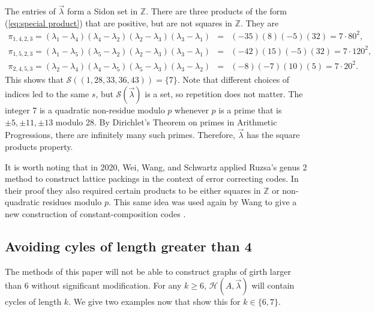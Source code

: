 \documentclass[12pt]{article}%
\begin{document}
The entries of $\vec{ \lambda}$ form a Sidon set 
in $\mathbb{Z}$.  There are three products of the form (\ref{eq:special product}) that are positive, but are not squares in $\mathbb{Z}$.  They are
\begin{eqnarray*}
    \pi_{1,4,2,3} = 
    (\lambda_1 - \lambda_4)( \lambda_4 - \lambda_2)
    (\lambda_2 - \lambda_3)( \lambda_3 - \lambda_1) 
    &=& (-35)(8)(-5)(32) = 7 \cdot 80^2, \\
   \pi_{1,5,2,3} =
   (\lambda_1 - \lambda_5)( \lambda_5 - \lambda_2) 
   (\lambda_2 - \lambda_3)(\lambda_3 - \lambda_1)
   & = &  (-42)(15)(-5)(32) =  7 \cdot 120^2, \\
    \pi_{2,4,5,3} = 
    ( \lambda_2 - \lambda_4) ( \lambda_4 - \lambda_5) 
    (\lambda_5 - \lambda_3) ( \lambda_3 - \lambda_2) 
    & = &     (-8)(-7)(10)(5) = 7 \cdot 20^2.  
\end{eqnarray*}
This shows that  $\mathcal{S} ( ( 1,28,33,36,43 )) = \{ 7 \}$.  Note that different choices of indices led to the same $s$, but 
$\mathcal{S} ( \vec{ \lambda} ) $ is a set, so repetition does not matter. 
The integer 7 is a quadratic non-residue modulo $p$ whenever $p$ is a prime that is $\pm 5, \pm 11, \pm 13$ modulo 28.  By Dirichlet's Theorem on primes in Arithmetic Progressions, there are infinitely many such primes.  
Therefore, $\vec{ \lambda}$ has the square products property.  

 It is worth noting that in 2020, Wei, Wang, and Schwartz \cite{WWS} applied Ruzsa's genus 2 method to 
 construct lattice packings in the context of error correcting codes. 
 In their proof they also required certain products to be either squares in $\mathbb{Z}$ or non-quadratic residues modulo $p$.  This same idea was used again by Wang 
 to give a new construction of constant-composition codes \cite{Wang}.    


\subsection{Avoiding cyles of length greater than 4}\label{section: longer cycles}

The methods of this paper will not be able to construct graphs of girth larger than $6$ without significant modification. For any $k\geq 6$, $\mathcal{H}(A,\vec{\lambda})$ will contain cycles of length $k$. We give two examples now that show this for $k\in \{6,7\}$. 
 
\end{document}
